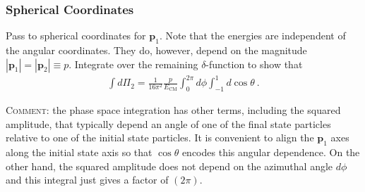 \documentclass[12pt]{article}
\renewcommand{\vec}[1]{\mathbf{#1}} %
\begin{document}
\subsubsection{Spherical Coordinates}

Pass to spherical coordinates for $\vec{p}_1$. Note that the energies are independent of the angular coordinates. They do, however, depend on the magnitude $|\vec{p}_1| = |\vec{p}_2| \equiv p$. Integrate over the remaining $\delta$-function to show that
\begin{align}
	\int d\Pi_2 = \frac{1}{16\pi^2}\frac{p}{E_\text{CM}} \int_0^{2\pi} d\phi \int_{-1}^1 d\cos\theta \ .
\end{align}

\textsc{Comment:} the phase space integration has other terms, including the squared amplitude, that typically depend an angle of one of the final state particles relative to one of the initial state particles. It is convenient to align the $\vec{p}_1$ axes along the initial state axis so that $\cos\theta$ encodes this angular dependence. On the other hand, the squared amplitude does not depend on the azimuthal angle $d\phi$ and this integral just gives a factor of $(2\pi)$.









\end{document}
